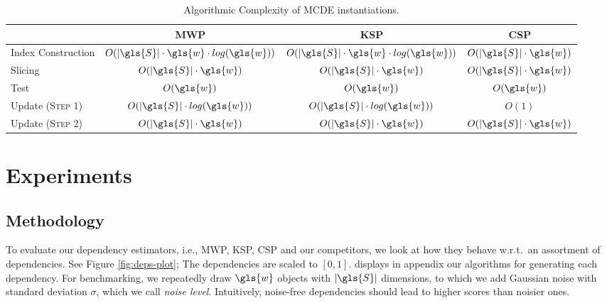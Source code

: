 \begin{table}
\caption{Algorithmic Complexity of \gls{MCDE} instantiations.}
\label{tab:complexity}
\centering
\addtolength{\tabcolsep}{-1pt}
\centering
\small
\renewcommand{\arraystretch}{0.8}%
\begin{tabular}{lccc}
\toprule
& \gls{MWP} & \gls{KSP} & \gls{CSP} \\
\midrule
Index Construction & $O(|\gls{S}| \cdot \gls{w} \cdot log(\gls{w}))$ & $O(|\gls{S}| \cdot \gls{w} \cdot log(\gls{w}))$ & $O(|\gls{S}| \cdot \gls{w})$ \\
Slicing & $O(|\gls{S}| \cdot \gls{w})$              & $O(|\gls{S}| \cdot \gls{w})$              & $O(|\gls{S}| \cdot \gls{w})$ \\
Test & $O(\gls{w})$                      & $O(\gls{w})$                      & $O(\gls{w})$         \\
Update (\textsc{Step 1}) & $O(|\gls{S}| \cdot log(\gls{w}))$                 & $O(|\gls{S}| \cdot log(\gls{w}))$                 & $O(1)$         \\
Update (\textsc{Step 2})   & $O(|\gls{S}| \cdot \gls{w})$                      & $O(|\gls{S}| \cdot \gls{w})$                      & $O(|\gls{S}| \cdot \gls{w})$         \\
\bottomrule
\end{tabular}
\end{table}

\section{Experiments}
\label{evaluation}

\subsection{Methodology}

To evaluate our dependency estimators, i.e., \gls{MWP}, \gls{KSP}, \gls{CSP} and our competitors, we look at how they behave w.r.t.\ an assortment of dependencies. See Figure \ref{fig:deps-plot}; The dependencies are scaled to $[0,1]$. \cite{DBLP:conf/ssdbm/FoucheB19} displays in appendix our algorithms for generating each dependency. 
For benchmarking, we repeatedly draw $\gls{w}$ objects with $|\gls{S}|$ dimensions, to which we add Gaussian noise with standard deviation $\sigma$, which we call \textit{noise level}. 
Intuitively, noise-free dependencies should lead to higher scores than noisier ones. 

